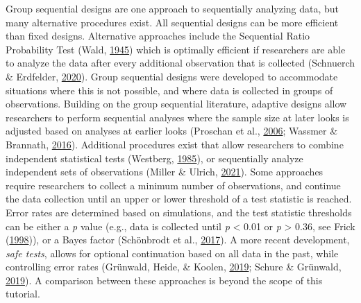 \documentclass[
  english,
  ,man,floatsintext]{apa6}
\begin{document}
Group sequential designs are one approach to sequentially analyzing data, but many alternative procedures exist. All sequential designs can be more efficient than fixed designs. Alternative approaches include the Sequential Ratio Probability Test (Wald, \protect\hyperlink{ref-wald_sequential_1945}{1945}) which is optimally efficient if researchers are able to analyze the data after every additional observation that is collected (Schnuerch \& Erdfelder, \protect\hyperlink{ref-schnuerch_controlling_2020}{2020}). Group sequential designs were developed to accommodate situations where this is not possible, and where data is collected in groups of observations. Building on the group sequential literature, adaptive designs allow researchers to perform sequential analyses where the sample size at later looks is adjusted based on analyses at earlier looks (Proschan et al., \protect\hyperlink{ref-proschan_statistical_2006}{2006}; Wassmer \& Brannath, \protect\hyperlink{ref-wassmer_group_2016}{2016}). Additional procedures exist that allow researchers to combine independent statistical tests (Westberg, \protect\hyperlink{ref-westberg_combining_1985}{1985}), or sequentially analyze independent sets of observations (Miller \& Ulrich, \protect\hyperlink{ref-miller_simple_2021}{2021}). Some approaches require researchers to collect a minimum number of observations, and continue the data collection until an upper or lower threshold of a test statistic is reached. Error rates are determined based on simulations, and the test statistic thresholds can be either a \emph{p} value (e.g., data is collected until \emph{p} \textless{} 0.01 or \emph{p} \textgreater{} 0.36, see Frick (\protect\hyperlink{ref-frick_better_1998}{1998})), or a Bayes factor (Schönbrodt et al., \protect\hyperlink{ref-schonbrodt_sequential_2017}{2017}). A more recent development, \emph{safe tests}, allows for optional continuation based on all data in the past, while controlling error rates (Grünwald, Heide, \& Koolen, \protect\hyperlink{ref-grunwald_safe_2019}{2019}; Schure \& Grünwald, \protect\hyperlink{ref-ter_schure_accumulation_2019}{2019}). A comparison between these approaches is beyond the scope of this tutorial.
\end{document}
